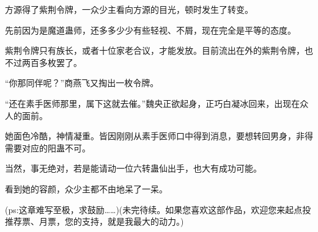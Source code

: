 \begin{this_body}
方源得了紫荆令牌，一众少主看向方源的目光，顿时发生了转变。

先前因为是魔道蛊师，还多多少少有些轻视、不屑，现在完全是平等的态度。

紫荆令牌只有族长，或者十位家老合议，才能发放。目前流出在外的紫荆令牌，也不过两百多枚罢了。

“你那同伴呢？”商燕飞又掏出一枚令牌。

“还在素手医师那里，属下这就去催。”魏央正欲起身，正巧白凝冰回来，出现在众人的面前。

她面色冷酷，神情凝重。皆因刚刚从素手医师口中得到消息，要想转回男身，非得需要对应的阳蛊不可。

当然，事无绝对，若是能请动一位六转蛊仙出手，也大有成功可能。

看到她的容颜，众少主都不由地呆了一呆。

(ps:这章难写至极，求鼓励……)(未完待续。如果您喜欢这部作品，欢迎您来起点投推荐票、月票，您的支持，就是我最大的动力。)

\end{this_body}

